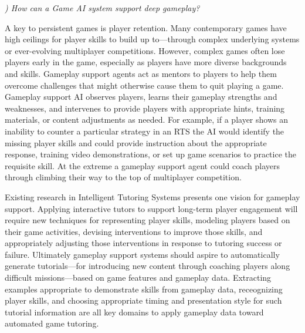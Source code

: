 \documentclass[conference]{IEEEtran}
\newcounter{questionno}
\newcommand{\subsubsectionx}[1]{{\em {\arabic{questionno}) #1}}
	\addtocounter{questionno}{1}
	}
\begin{document}
\subsubsectionx{How can a Game AI system support deep gameplay?}
A key to persistent games is player retention.
Many contemporary games have high ceilings for player skills to build up to---through complex underlying systems or ever-evolving multiplayer competitions. 
However, complex games often lose players early in the game, especially as players have more diverse backgrounds and skills.
Gameplay support agents act as mentors to players to help them overcome challenges that might otherwise cause them to quit playing a game. 
Gameplay support AI observes players, learns their gameplay strengths and weaknesses, and intervenes to provide players with appropriate hints, training materials, or content adjustments as needed. 
For example, if a player shows an inability to counter a particular strategy in an RTS the AI would identify the missing player skills and could provide instruction about the appropriate response, training video demonstrations, or set up game scenarios to practice the requisite skill. 
At the extreme a gameplay support agent could coach players through climbing their way to the top of multiplayer competition.


Existing research in Intelligent Tutoring Systems \cite{vanlehn2006:behav-its} presents one vision for gameplay support. 
Applying interactive tutors to support long-term player engagement will require new techniques for representing player skills, modeling players based on their game activities, devising interventions to improve those skills, and appropriately adjusting those interventions in response to tutoring success or failure. 
Ultimately gameplay support systems should aspire to automatically generate tutorials---for introducing new content through coaching players along difficult missions---based on game features and gameplay data. Extracting examples appropriate to demonstrate skills from gameplay data, receognizing player skills, and choosing appropriate timing and presentation style for such tutorial information are all key domains to apply gameplay data toward automated game tutoring.
\end{document}

